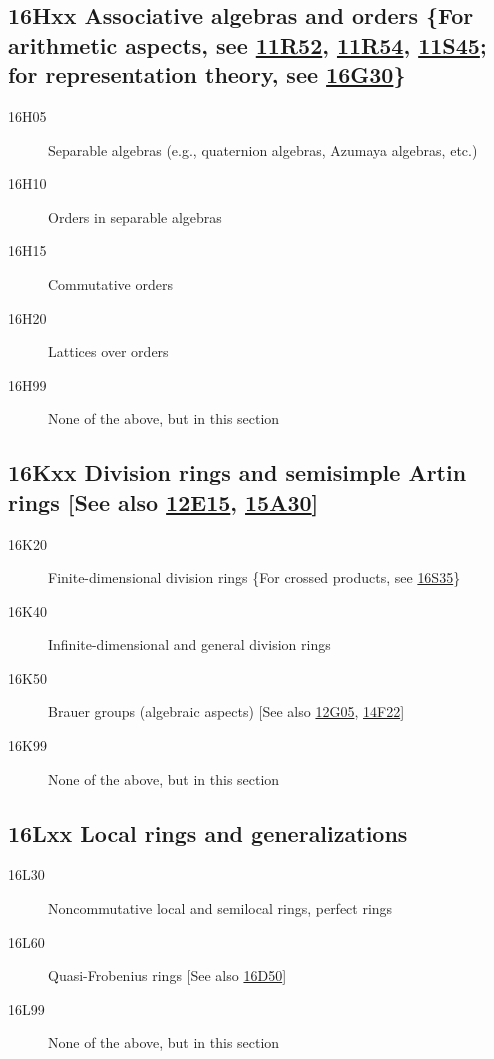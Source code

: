 \subsection*{16Hxx  Associative algebras and orders \{For arithmetic aspects, see \hyperref[11R52]{11R52}, \hyperref[11R54]{11R54}, \hyperref[11S45]{11S45}; for representation theory, see \hyperref[16G30]{16G30}\} }\label{16Hxx}
\begin{description}  
\item [16H05]\label{16H05} Separable algebras (e.g., quaternion algebras, Azumaya algebras, etc.)
\item [16H10]\label{16H10} Orders in separable algebras
\item [16H15]\label{16H15} Commutative orders
\item [16H20]\label{16H20} Lattices over orders
\item [16H99]\label{16H99} None of the above, but in this section
\end{description}
\subsection*{16Kxx  Division rings and semisimple Artin rings [See also \hyperref[12E15]{12E15}, \hyperref[15A30]{15A30}] }\label{16Kxx}
\begin{description}  
\item [16K20]\label{16K20} Finite-dimensional division rings \{For crossed products, see \hyperref[16S35]{16S35}\}
\item [16K40]\label{16K40} Infinite-dimensional and general division rings
\item [16K50]\label{16K50} Brauer groups (algebraic aspects) [See also \hyperref[12G05]{12G05}, \hyperref[14F22]{14F22}]
\item [16K99]\label{16K99} None of the above, but in this section
\end{description}
\subsection*{16Lxx  Local rings and generalizations }\label{16Lxx}
\begin{description}  
\item [16L30]\label{16L30} Noncommutative local and semilocal rings, perfect rings
\item [16L60]\label{16L60} Quasi-Frobenius rings [See also \hyperref[16D50]{16D50}]
\item [16L99]\label{16L99} None of the above, but in this section
\end{description}

